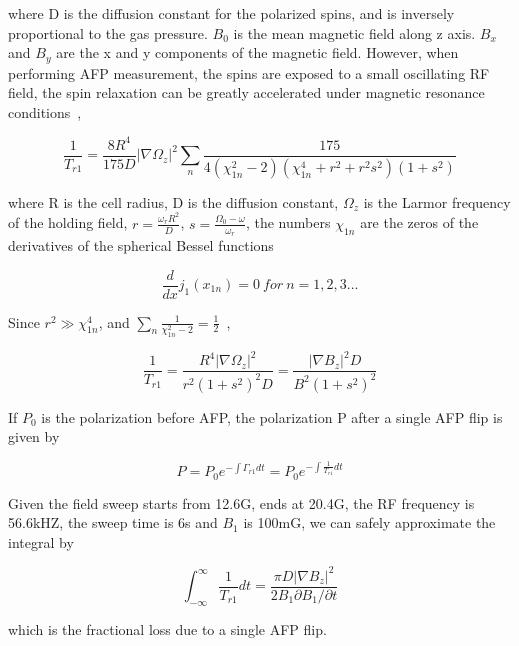 where D is the diffusion constant for the polarized spins, and is inversely proportional to the gas pressure. $B_{0}$ is the mean magnetic field along z axis. $B_{x}$ and $B_{y}$ are the x and y components of the magnetic field. However, when performing AFP measurement, the spins are exposed to a small oscillating RF field, the spin relaxation can be greatly accelerated under magnetic resonance conditions~\cite{PhysRevA.38.5092},

\begin{equation}
\frac{1}{T_{r1}} = \frac{8R^{4}}{175D}|\nabla \Omega_{z}|^{2}\sum_{n} \frac{175}{4(\chi_{1n}^{2}-2)(\chi_{1n}^{4}+r^{2}+r^{2}s^{2})(1+s^{2})}
\end{equation}

where R is the cell radius, D is the diffusion constant, $\Omega_{z}$ is the Larmor frequency of the holding field, $r=\frac{\omega_{r}R^{2}}{D}$, $s=\frac{\Omega_{0}-\omega}{\omega_{r}}$, the numbers $\chi_{1n}$ are the zeros of the derivatives of the spherical Bessel functions

\begin{equation}
\frac{d}{dx}j_{1}(x_{1n})=0~for~n=1,2,3...
\end{equation}

Since $r^{2}\gg \chi_{1n}^{4}$, and $\sum_{n}\frac{1}{\chi_{1n}^{2}-2}=\frac{1}{2}$~\cite{PhysRevA.37.2877},

\begin{equation}
\frac{1}{T_{r1}}=\frac{R^{4}|\nabla\Omega_{z}|^{2}}{r^{2}(1+s^{2})^{2}D}=\frac{|\nabla B_{z}|^{2}D}{B^{2}(1+s^{2})^2}
\end{equation}

If $P_{0}$ is the polarization before AFP, the polarization P after a single AFP flip is given by 

\begin{equation}
P=P_{0}e^{-\int \Gamma_{r1} dt}=P_{0}e^{-\int \frac{1}{T_{r1}}dt}
\end{equation}

Given the field sweep starts from 12.6G, ends at 20.4G, the RF frequency is 56.6kHZ, the sweep time is 6s and $B_{1}$ is 100mG, we can safely approximate the integral by 

\begin{equation}
\int_{-\infty}^{\infty} \frac{1}{T_{r1}}dt=\frac{\pi D|\nabla B_{z}|^{2}}{2B_{1}\partial B_{1}/\partial t}
\end{equation}

which is the fractional loss due to a single AFP flip.

